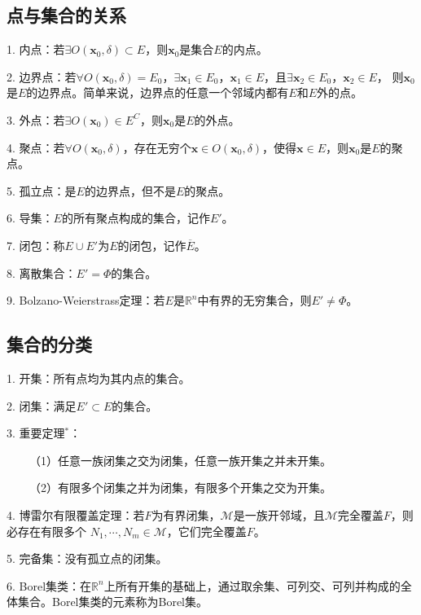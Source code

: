 \subsection{点与集合的关系}

1. 内点：若$\exists O(\boldsymbol{x}_0,\delta)\subset E$，则$\boldsymbol{x}_0$是集合$E$的内点。

2. 边界点：若$\forall O(\boldsymbol{x}_0,\delta) =E_0$，$\exists \boldsymbol{x}_1 \in E_0$，$\boldsymbol{x}_1 \in E$，且$\exists \boldsymbol{x}_2 \in E_0$，$\boldsymbol{x}_2 \in E$，
则$\boldsymbol{x}_0$是$E$的边界点。简单来说，边界点的任意一个邻域内都有$E$和$E$外的点。

3. 外点：若$\exists O(\boldsymbol{x}_0)\in E^C$，则$\boldsymbol{x}_0$是$E$的外点。

4. 聚点：若$\forall O(\boldsymbol{x}_0,\delta)$，存在无穷个$\boldsymbol{x}\in O(\boldsymbol{x}_0,\delta)$，使得$\boldsymbol{x}\in E$，则$\boldsymbol{x}_0$是$E$的聚点。

5. 孤立点：是$E$的边界点，但不是$E$的聚点。

6. 导集：$E$的所有聚点构成的集合，记作$E'$。

7. 闭包：称$E\cup E'$为$E$的闭包，记作$\overline{E}$。

8. 离散集合：$E'=\Phi$的集合。

9. Bolzano-Weierstrass定理：若$E$是$\mathbb{R}^n$中有界的无穷集合，则$E'\neq \Phi$。

\subsection{集合的分类}

1. 开集：所有点均为其内点的集合。

2. 闭集：满足$E' \subset E$的集合。

3. 重要定理$^*$：

~~~~（1）任意一族闭集之交为闭集，任意一族开集之并未开集。

~~~~（2）有限多个闭集之并为闭集，有限多个开集之交为开集。

4. 博雷尔有限覆盖定理：若$F$为有界闭集，$\mathscr{M}$是一族开邻域，且$\mathscr{M}$完全覆盖$F$，则必存在有限多个
$N_1,\cdots,N_m\in \mathscr{M}$，它们完全覆盖$F$。

5. 完备集：没有孤立点的闭集。

6. Borel集类：在$\mathbb{R}^n$上所有开集的基础上，通过取余集、可列交、可列并构成的全体集合。Borel集类的元素称为Borel集。






